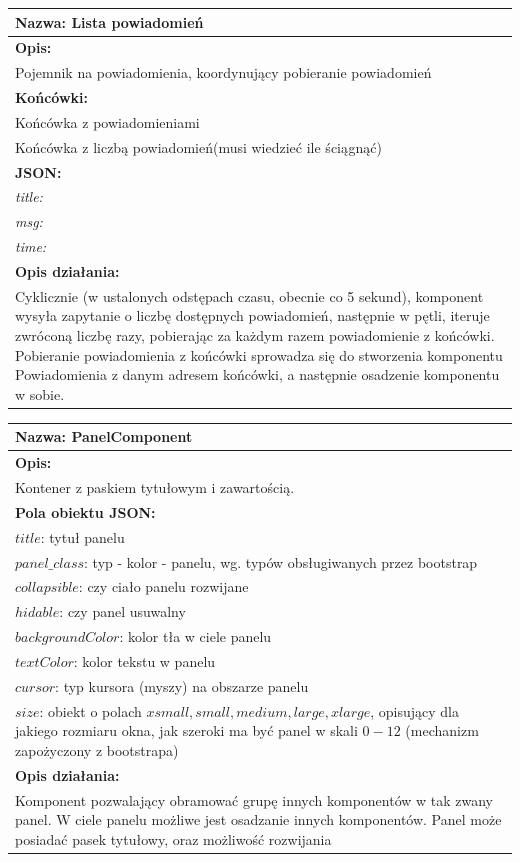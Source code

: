 \documentclass[licencjacka]{pracamgr}
\begin{document}
\begin{tabularx}{\linewidth}{|X|}\hline
\textbf{Nazwa:}
Lista powiadomień
\\\hline
\textbf{Opis:}\\

Pojemnik na powiadomienia, koordynujący pobieranie powiadomień\\\hline
\textbf{Końcówki:}\\
Końcówka z powiadomieniami\\
Końcówka z liczbą powiadomień(musi wiedzieć ile ściągnąć)
\\\hline
\textbf{JSON:}\\
\textit{title:}\\
\textit{msg:}\\
\textit{time:} \\ \hline
\textbf{Opis działania:}\\
Cyklicznie (w ustalonych odstępach czasu, obecnie co 5 sekund), komponent
wysyła zapytanie o liczbę dostępnych powiadomień, następnie w pętli, iteruje zwróconą liczbę razy,
pobierając za każdym razem powiadomienie z końcówki. Pobieranie powiadomienia z końcówki sprowadza się
do stworzenia komponentu Powiadomienia z danym adresem końcówki, a następnie osadzenie komponentu w sobie.\\\hline
\end{tabularx}


\begin{tabularx}{\linewidth}{|X|}\hline
\textbf{Nazwa:}
PanelComponent
\\\hline
\textbf{Opis:}\\
Kontener z paskiem tytułowym i zawartością.\\
\hline
\textbf{Pola obiektu JSON:} \\
$title$: tytuł panelu\\
$panel\_class$: typ - kolor - panelu, wg. typów obsługiwanych przez bootstrap\\
$collapsible$: czy ciało panelu rozwijane\\
$hidable$: czy panel usuwalny\\
$backgroundColor$: kolor tła w ciele panelu\\
$textColor$: kolor tekstu w panelu\\
$cursor$: typ kursora (myszy) na obszarze panelu\\
$size$: obiekt o polach $xsmall, small, medium, large, xlarge$, opisujący dla jakiego rozmiaru okna, jak szeroki ma być panel w skali $0 - 12$ (mechanizm zapożyczony z bootstrapa)
\\\hline
\textbf{Opis działania:}\\
Komponent pozwalający obramować grupę innych komponentów w tak zwany panel.
W ciele panelu możliwe jest osadzanie innych komponentów. Panel może posiadać pasek tytułowy, oraz możliwość rozwijania\\\hline

\end{tabularx}
\end{document}
